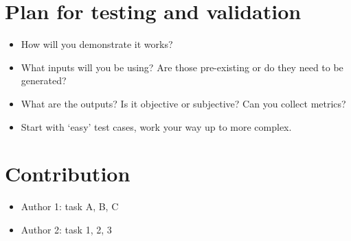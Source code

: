 \documentclass[journal,onecolumn, draftclsnofoot, 12pt]{IEEEtran}
\begin{document}
\section{Plan for testing and validation}
\begin{itemize}
    \item How will you demonstrate it works?
    \item What inputs will you be using?  Are those pre-existing or do they need to be generated?
    \item What are the outputs?  Is it objective or subjective?  Can you collect metrics?
    \item Start with ‘easy’ test cases, work your way up to more complex. 
\end{itemize}

\section{Contribution}
\begin{itemize}
    \item Author 1: task A, B, C
    \item Author 2: task 1, 2, 3
\end{itemize}



 


\end{document}
